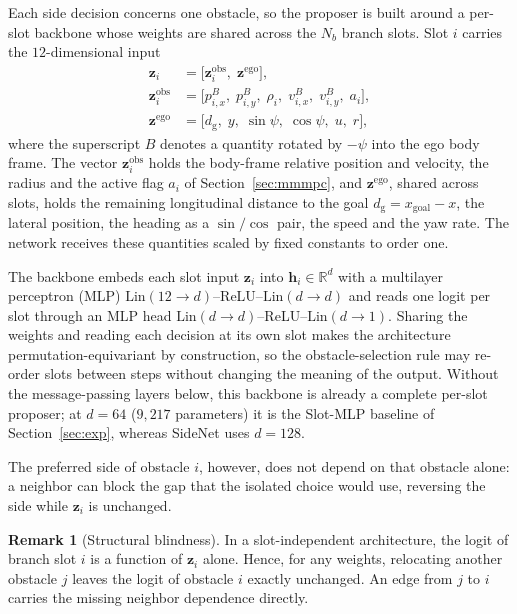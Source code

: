 \documentclass{article}
\theoremstyle{definition}
\newtheorem{remark}{Remark}
\begin{document}
Each side decision concerns one obstacle, so the proposer is built
around a per-slot backbone whose weights are shared across the $N_b$ branch
slots. Slot $i$ carries the $12$-dimensional input
\begin{equation}
\begin{aligned}
\mathbf{z}_i&=\big[\mathbf{z}^{\mathrm{obs}}_i,\;\mathbf{z}^{\mathrm{ego}}\big],\\
\mathbf{z}^{\mathrm{obs}}_i&=\big[p_{i,x}^{B},\;p_{i,y}^{B},\;\rho_i,\;
v_{i,x}^{B},\;v_{i,y}^{B},\;a_i\big],\\
\mathbf{z}^{\mathrm{ego}}&=\big[d_{\mathrm{g}},\;y,\;\sin\psi,\;\cos\psi,\;u,\;r\big],
\end{aligned}
\label{eq:node}
\end{equation}
where the superscript $B$ denotes a quantity rotated by $-\psi$ into the ego body frame. The vector $\mathbf{z}^{\mathrm{obs}}_i$ holds the body-frame relative position and velocity, the radius and the active flag $a_i$ of Section~\ref{sec:mmmpc}, and $\mathbf{z}^{\mathrm{ego}}$, shared across slots, holds the remaining longitudinal distance to the goal
$d_{\mathrm{g}}=x_{\mathrm{goal}}-x$, the lateral position, the heading as a
$\sin/\cos$ pair, the speed and the yaw rate. The network receives these quantities scaled by fixed constants to order
one.

The backbone embeds each slot input $\mathbf{z}_i$ into $\mathbf{h}_i\in\mathbb{R}^d$ with a multilayer perceptron (MLP)
$\mathrm{Lin}(12{\to}d)$--ReLU--$\mathrm{Lin}(d{\to}d)$ and reads one logit
per slot through an MLP head
$\mathrm{Lin}(d{\to}d)$--ReLU--$\mathrm{Lin}(d{\to}1)$. Sharing the weights and reading each
decision at its own slot makes the architecture permutation-equivariant by
construction, so the obstacle-selection rule may re-order slots between steps without
changing the meaning of the output. Without the message-passing layers below, this backbone is already a complete
per-slot proposer; at $d=64$ ($9{,}217$ parameters) it is the Slot-MLP baseline
of Section~\ref{sec:exp}, whereas SideNet uses $d=128$.

The preferred side of obstacle $i$, however, does not depend on that obstacle alone: a neighbor can block the gap that the isolated choice would use, reversing the side while $\mathbf{z}_i$ is unchanged.

\begin{remark}[Structural blindness]
\label{rem:blind}
In a slot-independent architecture, the logit of branch slot $i$ is a function
of $\mathbf{z}_i$ alone. Hence, for any weights, relocating another obstacle
$j$ leaves the logit of obstacle $i$ exactly unchanged.
An edge from $j$ to $i$ carries the missing neighbor dependence directly.
\end{remark}
\end{document}
